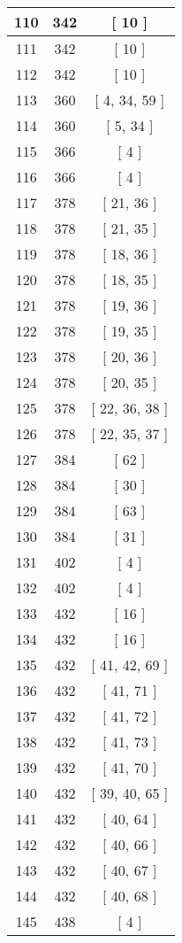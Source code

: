 \begin{center}
\begin{longtable}[H]{|| c c c ||}
\hline
110 & 342 & [ 10 ] \\ 
\hline
111 & 342 & [ 10 ] \\ 
\hline
112 & 342 & [ 10 ] \\ 
\hline
113 & 360 & [ 4, 34, 59 ] \\ 
\hline
114 & 360 & [ 5, 34 ] \\ 
\hline
115 & 366 & [ 4 ] \\ 
\hline
116 & 366 & [ 4 ] \\ 
\hline
117 & 378 & [ 21, 36 ] \\ 
\hline
118 & 378 & [ 21, 35 ] \\ 
\hline
119 & 378 & [ 18, 36 ] \\ 
\hline
120 & 378 & [ 18, 35 ] \\ 
\hline
121 & 378 & [ 19, 36 ] \\ 
\hline
122 & 378 & [ 19, 35 ] \\ 
\hline
123 & 378 & [ 20, 36 ] \\ 
\hline
124 & 378 & [ 20, 35 ] \\ 
\hline
125 & 378 & [ 22, 36, 38 ] \\ 
\hline
126 & 378 & [ 22, 35, 37 ] \\ 
\hline
127 & 384 & [ 62 ] \\ 
\hline
128 & 384 & [ 30 ] \\ 
\hline
129 & 384 & [ 63 ] \\ 
\hline
130 & 384 & [ 31 ] \\ 
\hline
131 & 402 & [ 4 ] \\ 
\hline
132 & 402 & [ 4 ] \\ 
\hline
133 & 432 & [ 16 ] \\ 
\hline
134 & 432 & [ 16 ] \\ 
\hline
135 & 432 & [ 41, 42, 69 ] \\ 
\hline
136 & 432 & [ 41, 71 ] \\ 
\hline
137 & 432 & [ 41, 72 ] \\ 
\hline
138 & 432 & [ 41, 73 ] \\ 
\hline
139 & 432 & [ 41, 70 ] \\ 
\hline
140 & 432 & [ 39, 40, 65 ] \\ 
\hline
141 & 432 & [ 40, 64 ] \\ 
\hline
142 & 432 & [ 40, 66 ] \\ 
\hline
143 & 432 & [ 40, 67 ] \\ 
\hline
144 & 432 & [ 40, 68 ] \\ 
\hline
145 & 438 & [ 4 ] \\ 

\end{longtable}
\end{center}
